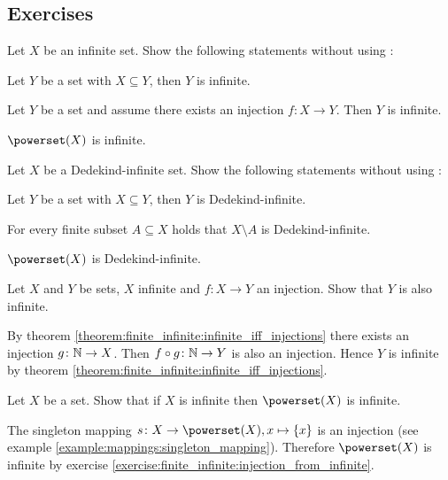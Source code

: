 \subsection{Exercises}

\begin{exercise}
    Let $X$ be an infinite set. Show the following statements without using :
    \begin{intheoremenumerate}
        \item Let $Y$ be a set with $X\subseteq Y$, then $Y$ is infinite.
        \item Let $Y$ be a set and assume there exists an injection $f\colon X\to Y$. Then $Y$ is infinite.
        \item $\powerset(X)$ is infinite.
    \end{intheoremenumerate}
\end{exercise}

\begin{exercise}
    Let $X$ be a Dedekind-infinite set. Show the following statements without using :
    \begin{intheoremenumerate}
        \item Let $Y$ be a set with $X\subseteq Y$, then $Y$ is Dedekind-infinite.
        \item For every finite subset $A\subseteq X$ holds that $X\setminus A$ is Dedekind-infinite.
        \item $\powerset(X)$ is Dedekind-infinite.
    \end{intheoremenumerate}
\end{exercise}

\begin{exercise}\label{exercise:finite_infinite:injection_from_infinite}
    Let $X$ and $Y$ be sets, $X$ infinite and $f\colon X\to Y$ an injection. Show that $Y$ is also infinite.
\end{exercise}
\begin{solution}
    By theorem \ref{theorem:finite_infinite:infinite_iff_injections} there exists an injection $g\colon\mathbb{N}\to X$. Then $f\circ g\colon\mathbb{N}\to Y$ is also an injection. Hence $Y$ is infinite by theorem \ref{theorem:finite_infinite:infinite_iff_injections}.
\end{solution}

\begin{exercise}
    Let $X$ be a set. Show that if $X$ is infinite then $\powerset(X)$ is infinite.
\end{exercise}
\begin{solution}
    The singleton mapping $s\colon X\to\powerset(X), x\mapsto\{x\}$ is an injection (see example \ref{example:mappings:singleton_mapping}). Therefore $\powerset(X)$ is infinite by exercise \ref{exercise:finite_infinite:injection_from_infinite}.
\end{solution}

